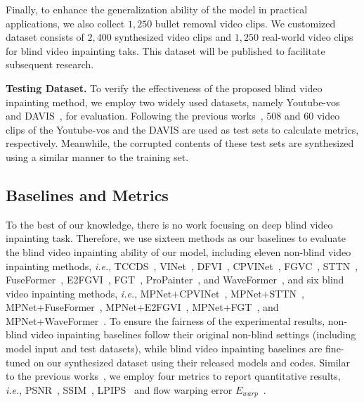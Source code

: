 Finally, to enhance the generalization ability of the model in practical applications, we also collect $1,250$ bullet removal video clips. 
We customized dataset consists of $2,400$ synthesized video clips and $1,250$ real-world video clips for blind video inpainting taks. 
This dataset will be published to facilitate subsequent research. 




\noindent\textbf{Testing Dataset.}
To verify the effectiveness of the proposed blind video inpainting method, 
we employ two widely used datasets, namely Youtube-vos~\cite{Xu2018YouTube} and DAVIS~\cite{Perazzi2016A}, for evaluation. Following the previous works~\cite{Li2020ShortTermAL,xu2019deep}, $508$ and $60$ video clips of the Youtube-vos and the DAVIS are used as test sets to calculate metrics, respectively. Meanwhile, the corrupted contents of these test sets are synthesized using a similar manner to the training set. 

\subsection{Baselines and Metrics}
To the best of our knowledge, there is no work focusing on deep blind video inpainting task. Therefore, we use sixteen methods as our baselines to evaluate the blind video inpainting ability of our model, including eleven non-blind video inpainting methods, \emph{i.e.}, TCCDS~\cite{huang2016temporally}, VINet~\cite{Kim_2019_CVPR,8931251}, DFVI~\cite{xu2019deep}, CPVINet~\cite{lee2019cpnet}, FGVC~\cite{Gao-ECCV-FGVC}, STTN~\cite{yan2020sttn}, FuseFormer~\cite{liu2021fuseformer}, E2FGVI~\cite{li2022towards}, FGT~\cite{zhang2022flow}, ProPainter~\cite{zhou2023propainter}, and WaveFormer~\cite{wu2024waveformer}, and six blind video inpainting methods, \emph{i.e.}, MPNet+CPVINet~\cite{lee2019cpnet}, MPNet+STTN~\cite{yan2020sttn}, MPNet+FuseFormer~\cite{liu2021fuseformer}, MPNet+E2FGVI~\cite{li2022towards}, MPNet+FGT~\cite{zhang2022flow}, and MPNet+WaveFormer~\cite{wu2024waveformer}.
To ensure the fairness of the experimental results, non-blind video inpainting baselines follow their original non-blind settings (including model input and test datasets), while blind video inpainting baselines are fine-tuned on our synthesized dataset using their released models and codes.
Similar to the previous works~\cite{9967838,9446636}, we employ four metrics to report quantitative results, \emph{i.e.}, PSNR~\cite{9008384}, SSIM~\cite{9010390}, LPIPS~\cite{zhang2018unreasonable} and flow warping error $E_{warp}$~\cite{lai2018learning}.


